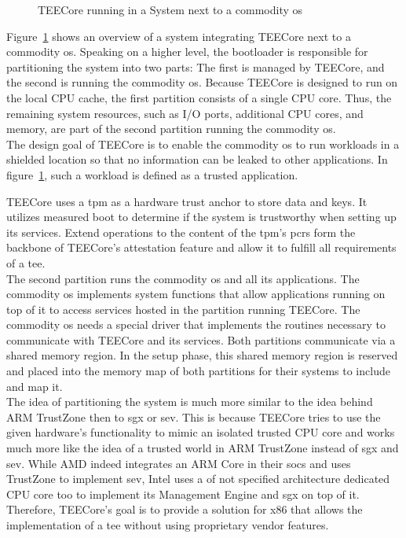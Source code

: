 \label{sec:30:system_overview}
\begin{figure}
  \begin{center}
    
    \caption{TEECore running in a System next to a commodity \gls{os}}
    \label{fig:30:tee_system_design}
  \end{center}
\end{figure}

Figure~\ref{fig:30:tee_system_design} shows an overview of a system integrating
TEECore next to a commodity \gls{os}. Speaking on a higher level, the bootloader
is responsible for partitioning the system into two parts: The first is managed
by TEECore, and the second is running the commodity \gls{os}. Because TEECore is
designed to run on the local CPU cache, the first partition consists of a single
CPU core. Thus, the remaining system resources, such as I/O ports, additional
CPU cores, and memory, are part of the second partition running the commodity
\gls{os}.\\

The design goal of TEECore is to enable the commodity \gls{os} to run workloads
in a shielded location so that no information can be leaked to other
applications. In figure~\ref{fig:30:tee_system_design}, such a workload is
defined as a trusted application.

TEECore uses a \gls{tpm} as a hardware trust anchor to store data and keys. It
utilizes measured boot to determine if the system is trustworthy when setting up
its services. Extend operations to the content of the \gls{tpm}'s \glspl{pcr}
form the backbone of TEECore's attestation feature and allow it to fulfill all
requirements of a \gls{tee}.\\

The second partition runs the commodity \gls{os} and all its applications. The
commodity \gls{os} implements system functions that allow applications running
on top of it to access services hosted in the partition running TEECore. The
commodity \gls{os} needs a special driver that implements the routines necessary
to communicate with TEECore and its services. Both partitions communicate via a
shared memory region. In the setup phase, this shared memory region is reserved
and placed into the memory map of both partitions for their systems to include
and map it.\\

The idea of partitioning the system is much more similar to the idea behind ARM
TrustZone then to \gls{sgx} or \gls{sev}. This is because TEECore
tries to use the given hardware's functionality to mimic an isolated trusted CPU
core and works much more like the idea of a trusted world in ARM TrustZone
instead of \gls{sgx} and \gls{sev}. While AMD indeed integrates an ARM Core in
their \glspl{soc} and uses TrustZone to implement \gls{sev}, Intel uses a of not
specified architecture dedicated CPU core too to implement its Management
Engine and \gls{sgx} on top of it. Therefore, TEECore's goal is to provide a
solution for x86 that allows the implementation of a \gls{tee} without using
proprietary vendor features.

